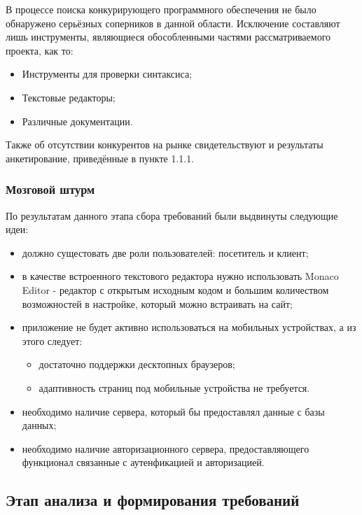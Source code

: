 В процессе поиска конкурирующего программного обеспечения не было обнаружено серьёзных соперников в данной области. Исключение составляют лишь инструменты, являющиеся обособленными частями рассматриваемого проекта, как то:

\begin{itemize}[wide]
    \item Инструменты для проверки синтаксиса;
    \item Текстовые редакторы;
    \item Различные документации.
\end{itemize}

Также об отсутствии конкурентов на рынке свидетельствуют и результаты анкетирование, приведённые в пункте 1.1.1.

\subsubsection{Мозговой штурм}

По результатам данного этапа сбора требований были выдвинуты следующие идеи:

\begin{itemize}
    \item должно сущестовать две роли пользователей: посетитель и клиент;
    \item в качестве встроенного текстового редактора нужно использовать Monaco Editor - редактор с открытым исходным кодом и большим количеством возможностей в настройке, который можно встраивать на сайт;
    \item приложение не будет активно использоваться на мобильных устройствах, а из этого следует:
    \begin{itemize}
        \item достаточно поддержки десктопных браузеров;
        \item адаптивность страниц под мобильные устройства не требуется.
    \end{itemize}
    \item необходимо наличие сервера, который бы предоставлял данные с базы данных;
    \item необходимо наличие авторизационного сервера, предоставляющего функционал связанные с аутенфикацией и авторизацией.
\end{itemize}

\subsection{Этап анализа и формирования требований}

